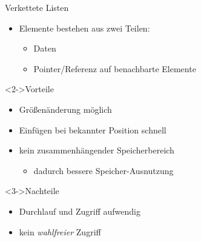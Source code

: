 \begin{frame}
    \begin{block}{Verkettete Listen}
        \begin{itemize}
            \item Elemente bestehen aus zwei Teilen:
            \begin{itemize}
                \item Daten
                \item Pointer/Referenz auf benachbarte Elemente
            \end{itemize}
        \end{itemize}
    \end{block}
    \begin{block}<2->{Vorteile}
        \begin{itemize}
            \item Größenänderung möglich
            \item Einfügen bei bekannter Position schnell
            \item kein zusammenhängender Speicherbereich
            \begin{itemize}
                \item dadurch bessere Speicher-Ausnutzung
            \end{itemize}
        \end{itemize}
    \end{block}
    \begin{block}<3->{Nachteile}
        \begin{itemize}
            \item Durchlauf und Zugriff aufwendig
            \item kein \emph{wahlfreier} Zugriff
        \end{itemize}
    \end{block}
\end{frame}